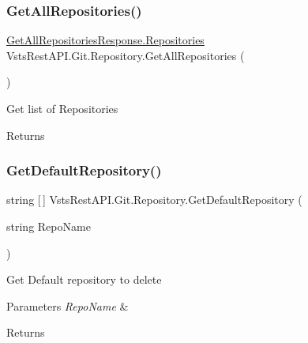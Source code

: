 \subsubsection{\texorpdfstring{Get\+All\+Repositories()}{GetAllRepositories()}}
{\footnotesize\ttfamily \mbox{\hyperlink{class_vsts_rest_a_p_i_1_1_viewmodel_1_1_repository_1_1_get_all_repositories_response_1_1_repositories}{Get\+All\+Repositories\+Response.\+Repositories}} Vsts\+Rest\+A\+P\+I.\+Git.\+Repository.\+Get\+All\+Repositories (\begin{DoxyParamCaption}{ }\end{DoxyParamCaption})}



Get list of Repositories 

\begin{DoxyReturn}{Returns}

\end{DoxyReturn}
\mbox{\label{class_vsts_rest_a_p_i_1_1_git_1_1_repository_a0188a1509a001dc7bafc7ca6829daa8e}} 
\subsubsection{\texorpdfstring{Get\+Default\+Repository()}{GetDefaultRepository()}}
{\footnotesize\ttfamily string \mbox{[}$\,$\mbox{]} Vsts\+Rest\+A\+P\+I.\+Git.\+Repository.\+Get\+Default\+Repository (\begin{DoxyParamCaption}\item[{string}]{Repo\+Name }\end{DoxyParamCaption})}



Get Default repository to delete 


\begin{DoxyParams}{Parameters}
{\em Repo\+Name} & \\
\hline
\end{DoxyParams}
\begin{DoxyReturn}{Returns}

\end{DoxyReturn}
\mbox{\label{class_vsts_rest_a_p_i_1_1_git_1_1_repository_adb713f76b948694752aff2d111a3ed85}} 
